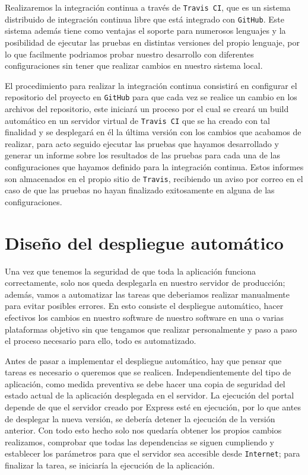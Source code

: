 \bigskip
Realizaremos la integración continua a través de {\tt Travis CI}, que es un sistema distribuido de integración continua libre que está
integrado con {\tt GitHub}. Este sistema además tiene como ventajas el soporte para numerosos lenguajes y la posibilidad de ejecutar
las pruebas en distintas versiones del propio lenguaje, por lo que facilmente podriamos probar nuestro desarrollo con diferentes
configuraciones sin tener que realizar cambios en nuestro sistema local.

\bigskip
El procedimiento para realizar la integración continua consistirá en configurar el repositorio del proyecto en {\tt GitHub} para que 
cada vez se realice un cambio en los archivos del repositorio, este iniciará un proceso por el cual se creará un build automático
en un servidor virtual de {\tt Travis CI} que se ha creado con tal finalidad y se desplegará en él la última versión con los cambios
que acabamos de realizar, para acto seguido ejecutar las pruebas que hayamos desarrollado y generar un informe sobre los resultados
de las pruebas para cada una de las configuraciones que hayamos definido para la integración continua. Estos informes son 
almacenados en el propio sitio de {\tt Travis}, recibiendo un aviso por correo en el caso de que las pruebas no hayan finalizado
exitosamente en alguna de las configuraciones.

\section{Diseño del despliegue automático}

Una vez que tenemos la seguridad de que toda la aplicación funciona correctamente, solo nos queda desplegarla en nuestro servidor
de producción; además, vamos a automatizar las tareas que deberiamos realizar manualmente para evitar posibles errores. En esto
consiste el despliegue automático, hacer efectivos los cambios en nuestro software de nuestro software en una o varias 
plataformas objetivo sin que tengamos que realizar personalmente y paso a paso el proceso necesario para ello, todo es 
automatizado.

\bigskip
Antes de pasar a implementar el despliegue automático, hay que pensar que tareas es necesario o queremos que se realicen. 
Independientemente del tipo de aplicación, como medida preventiva se debe hacer una copia de seguridad del estado actual de
la aplicación desplegada en el servidor. La ejecución del portal depende de que el servidor creado por Express esté en 
ejecución, por lo que antes de desplegar la nueva versión, se debería detener la ejecución de la versión anterior. Con todo esto
hecho solo nos quedaría obtener los propios cambios realizamos, comprobar que todas las dependencias se siguen cumpliendo y 
establecer los parámetros para que el servidor sea accesible desde {\tt Internet}; para finalizar la tarea, se iniciaría la ejecución
de la aplicación.

